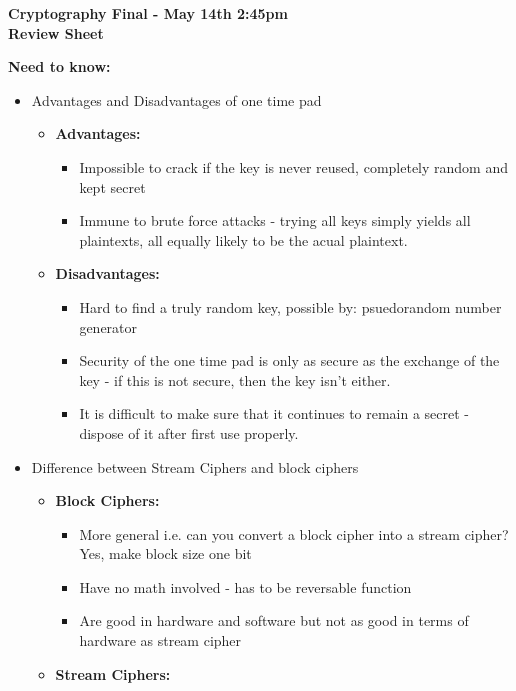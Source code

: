 \documentclass[12pt]{amsart}
\begin{document}
\thispagestyle{empty}

\begin{center}
{\bf Cryptography Final - May 14th 2:45pm}\\
{\bf Review Sheet}\\
\end{center}

{\bf Need to know:}\\

\begin{itemize}
\item{} Advantages and Disadvantages of one time pad
	\begin{itemize}
	\item{} {\bf Advantages:}
		\begin{itemize}
		\item{} Impossible to crack if the key is never reused, completely random and kept secret	
		\item{} Immune to brute force attacks - trying all keys simply yields all plaintexts, all equally likely to be the acual plaintext.
		\end{itemize}
	\item{} {\bf Disadvantages:}
		\begin{itemize}
		\item{} Hard to find a truly random key, possible by: psuedorandom number generator
		\item{} Security of the one time pad is only as secure as the exchange of the key - if this is not secure, then the key isn't either.
		\item{} It is difficult to make sure that it continues to remain a secret - dispose of it after first use properly.
		\end{itemize}
	\end{itemize}
\item{} Difference between Stream Ciphers and block ciphers
\begin{itemize}
	\item{} {\bf Block Ciphers:}
	\begin{itemize}
		\item{}More general i.e. can you convert a block cipher into a stream cipher?  Yes, make block size one bit
		\item{}Have no math involved - has to be reversable function
		\item{}Are good in hardware and software but not as good in terms of hardware as stream cipher
	\end{itemize}
	\item{} {\bf Stream Ciphers:}

\end{itemize}
\end{itemize}
\end{document}

